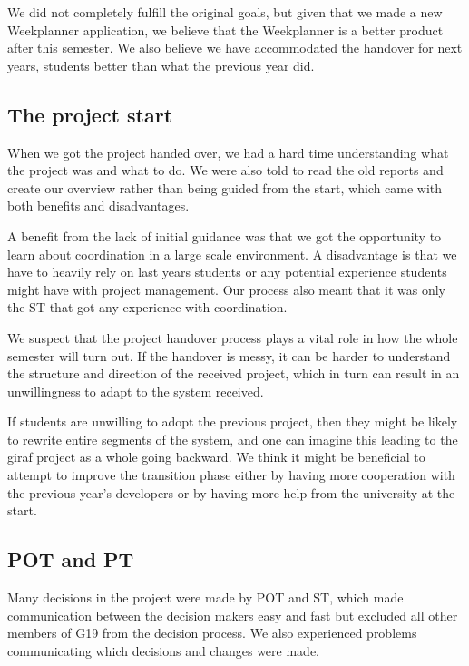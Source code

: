 We did not completely fulfill the original goals, but given that we made a new Weekplanner application, we believe that the Weekplanner is a better product after this semester. We also believe we have accommodated the handover for next years, students better than what the previous year did.

\subsection{The project start}

When we got the project handed over, we had a hard time understanding what the project was and what to do. We were also told to read the old reports and create our overview rather than being guided from the start, which came with both benefits and disadvantages.

A benefit from the lack of initial guidance was that we got the opportunity to learn about coordination in a large scale environment. A disadvantage is that we have to heavily rely on last years students or any potential experience students might have with project management. Our process also meant that it was only the \gls{ST} that got any experience with coordination. 

We suspect that the project handover process plays a vital role in how the whole semester will turn out. If the handover is messy, it can be harder to understand the structure and direction of the received project, which in turn can result in an unwillingness to adapt to the system received. 

If students are unwilling to adopt the previous project, then they might be likely to rewrite entire segments of the system, and one can imagine this leading to the \gls{giraf} project as a whole going backward. We think it might be beneficial to attempt to improve the transition phase either by having more cooperation with the previous year's developers or by having more help from the university at the start.

\subsection{POT and PT}

Many decisions in the project were made by \gls{POT} and \gls{ST}, which made communication between the decision makers easy and fast but excluded all other members of \gls{G19} from the decision process. We also experienced problems communicating which decisions and changes were made.

